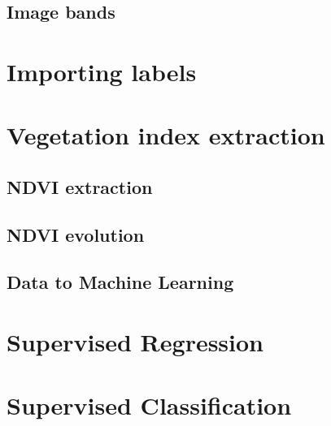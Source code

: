 \documentclass[c]{beamer}
\begin{document}
\subsection{Image bands}
\begin{frame}
 
\end{frame}

\section{Importing labels}
\begin{frame}
 
\end{frame}

\section{Vegetation index extraction}

\subsection{NDVI extraction}
\begin{frame}

\end{frame}

\subsection{NDVI evolution}
\begin{frame}

\end{frame}

\subsection{Data to Machine Learning}
\begin{frame}
 
\end{frame}

\section{Supervised Regression}
\begin{frame}

\end{frame}

\section{Supervised Classification}
\begin{frame}

\end{frame}
\end{document}
